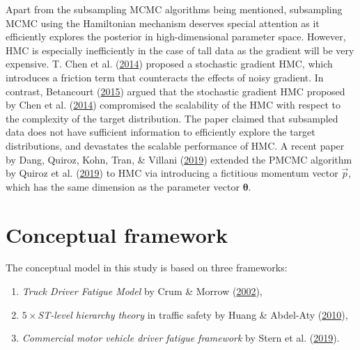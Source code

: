 \documentclass[12pt]{book}
\numberwithin{equation}{chapter}
\providecommand{\tightlist}{%
  \setlength{\itemsep}{0pt}\setlength{\parskip}{0pt}}
\begin{document}
Apart from the subsampling MCMC algorithms being mentioned, subsampling MCMC using the Hamiltonian mechanism deserves special attention as it efficiently explores the posterior in high-dimensional parameter space. However, HMC is especially inefficiently in the case of tall data as the gradient will be very expensive. T. Chen et al. (\protect\hyperlink{ref-chen2014stochastic}{2014}) proposed a stochastic gradient HMC, which introduces a friction term that counteracts the effects of noisy gradient. In contrast, Betancourt (\protect\hyperlink{ref-betancourt2015fundamental}{2015}) argued that the stochastic gradient HMC proposed by Chen et al. (\protect\hyperlink{ref-chen2014stochastic}{2014}) compromised the scalability of the HMC with respect to the complexity of the target distribution. The paper claimed that subsampled data does not have sufficient information to efficiently explore the target distributions, and devastates the scalable performance of HMC. A recent paper by Dang, Quiroz, Kohn, Tran, \& Villani (\protect\hyperlink{ref-dang2019hamiltonian}{2019}) extended the PMCMC algorithm by Quiroz et al. (\protect\hyperlink{ref-quiroz2019speeding}{2019}) to HMC via introducing a fictitious momentum vector \(\vec{p}\), which has the same dimension as the parameter vector \(\mathbf{\theta}\).

\hypertarget{conceptual-framework}{%
\section{Conceptual framework}\label{conceptual-framework}}

The conceptual model in this study is based on three frameworks:

\begin{enumerate}
\def\labelenumi{\arabic{enumi}.}
\tightlist
\item
  \emph{Truck Driver Fatigue Model} by Crum \& Morrow (\protect\hyperlink{ref-crum2002influence}{2002}),
\item
  \emph{\(5 \times\)ST-level hierarchy theory} in traffic safety by Huang \& Abdel-Aty (\protect\hyperlink{ref-huang2010multilevel}{2010}),
\item
  \emph{Commercial motor vehicle driver fatigue framework} by Stern et al. (\protect\hyperlink{ref-stern2019data}{2019}).
\end{enumerate}
\end{document}
